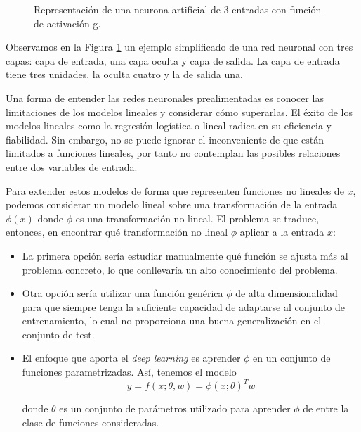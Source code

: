 \begin{figure}[h!]
	\caption{Representación de una neurona artificial de 3 entradas con función de activación g.}
	\label{fig:rrnn_artifical}
\end{figure}

  
Observamos en la Figura \ref{fig:rrnn_artifical} un ejemplo simplificado de una red neuronal con tres capas: capa de entrada, una capa oculta y capa de salida. La capa de entrada tiene tres unidades, la oculta cuatro y la de salida una.

Una forma de entender las redes neuronales prealimentadas es conocer las limitaciones de los modelos lineales y considerar cómo superarlas. El éxito de los modelos lineales como la regresión logística o lineal radica en su eficiencia y fiabilidad. Sin embargo, no se puede  ignorar el  inconveniente de que están limitados a funciones lineales, por tanto no contemplan las posibles relaciones entre dos variables de entrada.

Para extender estos modelos de forma que representen funciones no lineales de $x$, podemos considerar un modelo lineal sobre una transformación de la entrada $\phi(x)$ donde $\phi$ es una transformación no lineal. El problema se traduce, entonces, en encontrar qué transformación no lineal $\phi$ aplicar a la entrada $x$:

\begin{itemize}
	\item La primera opción sería estudiar manualmente qué función se ajusta más al problema concreto, lo que conllevaría un alto conocimiento del problema.
	\item Otra opción sería utilizar una función genérica $\phi$ de alta dimensionalidad para que siempre tenga la suficiente capacidad de adaptarse al conjunto de entrenamiento, lo cual no proporciona una buena generalización en el conjunto de test.
	\item El enfoque que aporta el \textit{deep learning} es aprender $\phi$ en un conjunto de funciones parametrizadas. Así, tenemos el modelo 
	$$y = f(x; \theta, w) = \phi(x; \theta)^T w$$ 
	
	donde $\theta$ es un conjunto de parámetros utilizado para aprender $\phi$ de entre la clase de funciones consideradas. 
\end{itemize}

